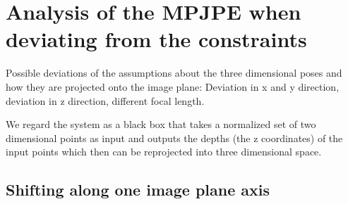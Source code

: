 \section{Analysis of the MPJPE when deviating from the constraints}

Possible deviations of the assumptions about the three dimensional poses and how they are projected onto the image plane: Deviation in x and y direction, deviation in z direction, different focal length.

We regard the system as a black box that takes a normalized set of two dimensional points as input and outputs the depths (the z coordinates) of the input points which then can be reprojected into three dimensional space.
\subsection{Shifting along one image plane axis}
\label{sec:x-shift-error}
